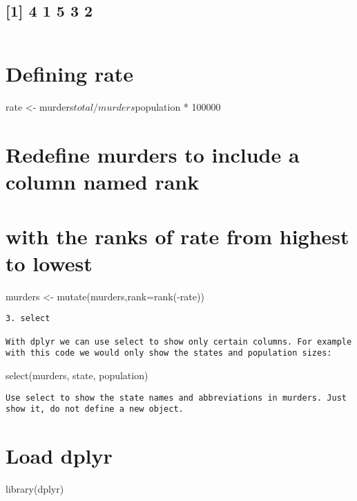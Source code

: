 \documentclass[
]{article}
\begin{document}
\hypertarget{section}{%
\subsection{{[}1{]} 4 1 5 3 2}\label{section}}

\begin{verbatim}
\end{verbatim}

\hypertarget{defining-rate}{%
\section{Defining rate}\label{defining-rate}}

rate \textless- murders\(total/ murders\)population * 100000

\hypertarget{redefine-murders-to-include-a-column-named-rank}{%
\section{Redefine murders to include a column named
rank}\label{redefine-murders-to-include-a-column-named-rank}}

\hypertarget{with-the-ranks-of-rate-from-highest-to-lowest}{%
\section{with the ranks of rate from highest to
lowest}\label{with-the-ranks-of-rate-from-highest-to-lowest}}

murders \textless- mutate(murders,rank=rank(-rate))

\begin{verbatim}
3. select

With dplyr we can use select to show only certain columns. For example with this code we would only show the states and population sizes:
\end{verbatim}

select(murders, state, population)

\begin{verbatim}
Use select to show the state names and abbreviations in murders. Just show it, do not define a new object.
\end{verbatim}

\hypertarget{load-dplyr}{%
\section{Load dplyr}\label{load-dplyr}}

library(dplyr)
\end{document}
